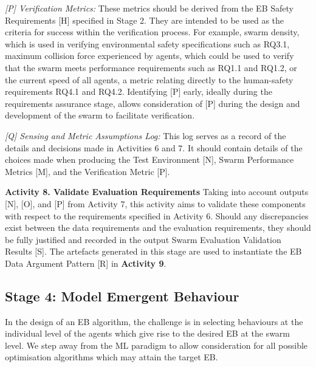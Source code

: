 \documentclass[runningheads]{llncs}
\begin{document}
\emph{[P] Verification Metrics:} These metrics should be derived from the EB Safety Requirements [H] specified in Stage 2. 
They are intended to be used as the criteria for success within the verification process.  
For example, swarm density, which is used in verifying environmental safety specifications such as RQ3.1, maximum collision force experienced by agents, which could be used to verify that the swarm meets performance requirements such as RQ1.1 and RQ1.2, or the current speed of all agents, a metric relating directly to the human-safety requirements RQ4.1 and RQ4.2. 
Identifying [P] early, ideally during the requirements assurance stage, allows consideration of [P] during the design and development of the swarm to facilitate verification. 

\emph{[Q] Sensing and Metric Assumptions Log:} This log serves as a record of the details and decisions made in Activities 6 and 7. It should contain details of the choices made when producing the Test Environment [N], Swarm Performance Metrics [M], and the Verification Metric [P].

\noindent\textbf{Activity 8. Validate Evaluation Requirements} Taking into account outputs [N], [O], and [P] from Activity 7, this activity aims to validate these components with respect to the requirements specified in Activity 6. Should any discrepancies exist between the data requirements and the evaluation requirements, they should be fully justified and recorded in the output Swarm Evaluation Validation Results [S]. 
The artefacts generated in this stage are used to instantiate the EB Data Argument Pattern [R] in \textbf{Activity 9}.

\subsection{Stage 4: Model Emergent Behaviour} \label{framework-stage4}
In the design of an EB algorithm, the challenge is in selecting behaviours at the individual level of the agents which give rise to the desired EB at the swarm level. 
We step away from the ML paradigm to allow consideration for all possible optimisation algorithms which may attain the target EB.
\end{document}
